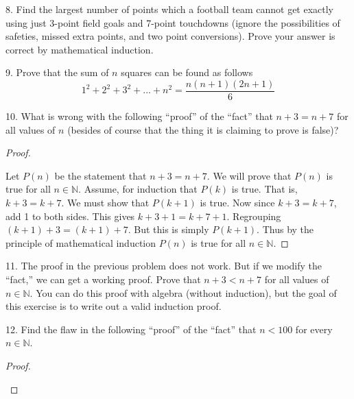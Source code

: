 \documentclass[10pt,]{book}
\theoremstyle{plain}
\theoremstyle{definition}
\numberwithin{equation}{chapter}
\def\N{\mathbb N}
\newcommand{\lt}{ < }
\begin{document}
\begin{exerciselist}
\par\smallskip
\item[8.]\hypertarget{exercise-191}{}
                Find the largest number of points which a football team cannot get exactly using just 3-point field goals and 7-point touchdowns (ignore the possibilities of safeties, missed extra points, and two point conversions). Prove your answer is correct by mathematical induction.
\par\smallskip
\item[9.]\hypertarget{exercise-192}{}
                Prove that the sum of \(n\) squares can be found as follows
                \begin{equation*}
                  1^2 +2^2 +3^2+...+n^2 = \frac{n(n+1)(2n+1)}{6}
                \end{equation*}
\par\smallskip
\item[10.]\hypertarget{exercise-193}{}
          What is wrong with the following ``proof'' of the ``fact'' that \(n+3 = n+7\) for all values of \(n\) (besides of course that the thing it is claiming to prove is false)?
\begin{proof}\hypertarget{proof-13}{}

            Let \(P(n)\) be the statement that \(n + 3 = n + 7\). We will prove that \(P(n)\) is true for all \(n \in \N\). Assume, for induction that \(P(k)\) is true. That is, \(k+3 = k+7\). We must show that \(P(k+1)\) is true. Now since \(k + 3 = k + 7\), add 1 to both sides. This gives \(k + 3 + 1 = k + 7 + 1\). Regrouping \((k+1) + 3 = (k+1) + 7\). But this is simply \(P(k+1)\). Thus by the principle of mathematical induction \(P(n)\) is true for all \(n \in \N\).
\end{proof}
\par\smallskip
\item[11.]\hypertarget{exercise-194}{}
          The proof in the previous problem does not work. But if we modify the ``fact,'' we can get a working proof. Prove that \(n + 3 \lt  n + 7\) for all values of \(n \in \N\). You can do this proof with algebra (without induction), but the goal of this exercise is to write out a valid induction proof.
\par\smallskip
\item[12.]\hypertarget{exercise-195}{}
          Find the flaw in the following ``proof'' of the ``fact'' that \(n \lt  100\) for every \(n \in \N\).
\begin{proof}\hypertarget{proof-15}{}


\end{proof}
\end{exerciselist}
\end{document}
